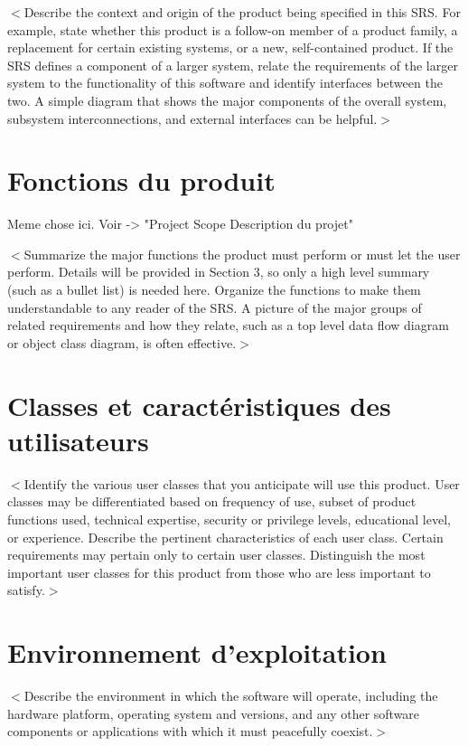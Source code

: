 \documentclass[titlepage]{report}
\begin{document}
$<$Describe the context and origin of the product being specified in this SRS.  
For example, state whether this product is a follow-on member of a product 
family, a replacement for certain existing systems, or a new, self-contained 
product. If the SRS defines a component of a larger system, relate the 
requirements of the larger system to the functionality of this software and 
identify interfaces between the two. A simple diagram that shows the major 
components of the overall system, subsystem interconnections, and external 
interfaces can be helpful.$>$

\section{Fonctions du produit}

Meme chose ici. Voir -> "Project Scope Description du projet"

$<$Summarize the major functions the product must perform or must let the user 
perform. Details will be provided in Section 3, so only a high level summary 
(such as a bullet list) is needed here. Organize the functions to make them 
understandable to any reader of the SRS. A picture of the major groups of 
related requirements and how they relate, such as a top level data flow diagram 
or object class diagram, is often effective.$>$

\section{Classes et caractéristiques des utilisateurs}
$<$Identify the various user classes that you anticipate will use this product.  
User classes may be differentiated based on frequency of use, subset of product 
functions used, technical expertise, security or privilege levels, educational 
level, or experience. Describe the pertinent characteristics of each user class.  
Certain requirements may pertain only to certain user classes. Distinguish the 
most important user classes for this product from those who are less important 
to satisfy.$>$

\section{Environnement d'exploitation}
$<$Describe the environment in which the software will operate, including the 
hardware platform, operating system and versions, and any other software 
components or applications with which it must peacefully coexist.$>$
\end{document}
